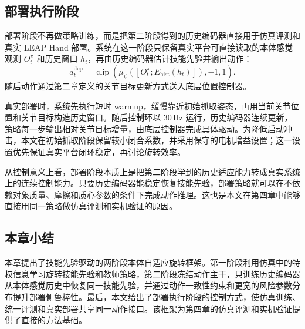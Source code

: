 \subsection{部署执行阶段}
\thesisbodyfont
部署阶段不再做策略训练，而是把第二阶段得到的历史编码器直接用于仿真评测和真实 LEAP Hand 部署。系统在这一阶段只保留真实平台可直接读取的本体感觉观测 \(O_t^\pi\) 和历史窗口 \(h_t\)，再由历史编码器估计技能先验并输出动作：
\begin{equation}
a_t^{\mathrm{dep}}
=
\operatorname{clip}\!\left(
\mu_\psi\!\left([O_t^\pi;E_{\mathrm{hist}}(h_t)]\right),
-1,1
\right).
\end{equation}
随后动作通过第二章定义的关节目标更新方式送入底层位置控制器。

真实部署时，系统先执行短时 warmup，缓慢靠近初始抓取姿态，再用当前关节位置和关节目标构造历史窗口。随后控制环以 \(30\,\mathrm{Hz}\) 运行，历史编码器连续更新，策略每一步输出相对关节目标增量，由底层控制器完成具体驱动。为降低启动冲击，本文在初始抓取阶段保留较小闭合系数，并采用保守的电机增益设置；这一设置优先保证真实平台闭环稳定，再讨论旋转效率。

从控制意义上看，部署阶段本质上是把第二阶段学到的历史适应能力转成真实系统上的连续控制能力。只要历史编码器能稳定恢复技能先验，部署策略就可以在不依赖对象质量、摩擦和质心参数的条件下完成动作推理。这也是本文在第四章中能够直接用同一策略做仿真评测和实机验证的原因。

\subsection{本章小结}
\thesisbodyfont
本章提出了技能先验驱动的两阶段本体自适应旋转框架。第一阶段利用仿真中的特权信息学习旋转技能先验和教师策略，第二阶段冻结动作主干，只训练历史编码器从本体感觉历史中恢复同一技能先验，并通过动作一致性约束和更宽的风险参数分布提升部署侧鲁棒性。最后，本文给出了部署执行阶段的控制方式，使仿真训练、统一评测和真实部署共享同一动作接口。该框架为第四章的仿真评测和实机验证提供了直接的方法基础。

